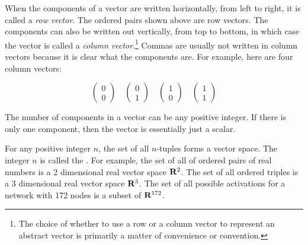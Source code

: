 When the components of a vector are written horizontally, from left to right,
it is called a {\em row vector}. The ordered pairs shown above are row 
vectors. The components can also be written out vertically, from top to 
bottom, in which case the vector is called a {\em column vector}.\footnote{The choice of whether
to use a row or a column vector to represent an abstract vector is primarily a matter of 
convenience or convention.} Commas are usually 
not written in column vectors because it is clear what the components are. For 
example, here are four column vectors:
\begin{small}
\begin{equation*}
\begin{pmatrix}
0 \\
0
\end{pmatrix} 
\quad 
\begin{pmatrix}
0 \\
1
\end{pmatrix} 
\quad 
\begin{pmatrix}
1 \\
0
\end{pmatrix} 
\quad 
\begin{pmatrix}
1 \\
1
\end{pmatrix} 
\end{equation*}
\end{small}
The number of components in a vector can be any positive integer. If there is
only one component, then the vector is essentially just a scalar.

   For any positive integer $n$, the set of all $n$-tuples forms a vector space.
The integer $n$ is called the . For 
example, the set of all of ordered pairs of real numbers is a 2 dimensional 
real vector space ${\bf R}^2$. The set of all ordered triples is a 3 dimensional real 
vector space ${\bf R}^3$. The set of all possible activations for a network with 172 nodes is a subset of  ${\bf R}^{172}$.

